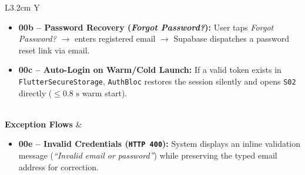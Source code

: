 \begin{table}[H]
\begin{tabularx}{\textwidth}{L{3.2cm} Y}
\begin{itemize}[nosep,leftmargin=1.4em]
    \item \textbf{00b -- Password Recovery (\textit{Forgot Password?}):} User taps \textit{Forgot Password?} $\to$ enters registered email $\to$ Supabase dispatches a password reset link via email.
    \item \textbf{00c -- Auto-Login on Warm/Cold Launch:} If a valid token exists in \texttt{FlutterSecureStorage}, \texttt{AuthBloc} restores the session silently and opens \texttt{S02} directly ($\le 0.8\text{ s}$ warm start).
\end{itemize} \\
\textbf{Exception Flows} &
\begin{itemize}[nosep,leftmargin=1.4em]
    \item \textbf{00e -- Invalid Credentials (\texttt{HTTP 400}):} System displays an inline validation message (\textit{``Invalid email or password''}) while preserving the typed email address for correction.
\end{itemize} \\
\bottomrule
\end{tabularx}
\end{table}

